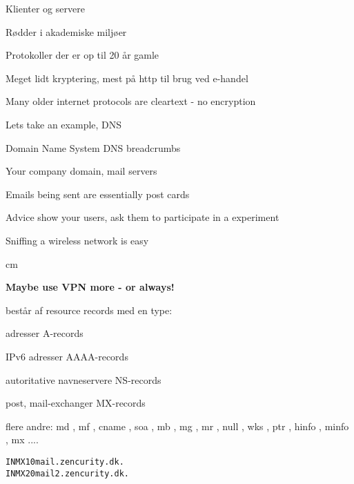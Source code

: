 \documentclass[Screen16to9,17pt]{foils}
\begin{document}


\begin{list1}
\item Klienter og servere
\item Rødder i akademiske miljøer
\item Protokoller der er op til 20 år gamle
\item Meget lidt kryptering, mest på http til brug ved e-handel
\end{list1}




\begin{list1}
\item Many older internet protocols are cleartext - no encryption
\item Lets take an example, DNS
\item Domain Name System DNS breadcrumbs
\begin{list2}
\item Your company domain, mail servers
\item Emails being sent are essentially post cards
\end{list2}
\vskip 1cm
\item Advice show your users, ask them to participate in a experiment
\item Sniffing a wireless network is easy
\end{list1}

 cm
\centerline{\bf\Large Maybe use VPN more - or always!}






\begin{list1}
  \item består af resource records med en type:
    \begin{list2}
\item adresser A-records
\item IPv6 adresser AAAA-records
\item autoritative navneservere NS-records
\item post, mail-exchanger MX-records
\item flere andre: md ,  mf ,  cname ,  soa ,
                  mb , mg ,  mr ,  null ,  wks ,  ptr ,
                  hinfo ,  minfo ,  mx ....
\end{list2}
\end{list1}
\begin{alltt}
        IN      MX      10      mail.zencurity.dk.
        IN      MX      20      mail2.zencurity.dk.
\end{alltt}
\end{document}
